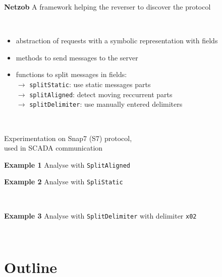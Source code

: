 \documentclass{beamer}
\newcounter{m} %
\newcounter{c} %
\begin{document}
\begin{frame}{\bf \textbf{Netzob}}
  A framework helping the reverser to discover the protocol
 
  ~

  \begin{itemize}
    \item abstraction of requests with a symbolic representation with fields
    \item methods to send messages to the server
    \item functions to split messages in fields:\\
    \quad\quad$\rightarrow$ \texttt{splitStatic}: use static messages parts\\
    \quad\quad$\rightarrow$ \texttt{splitAligned}: detect moving reccurrent parts\\
    \quad\quad$\rightarrow$ \texttt{splitDelimiter}: use manually entered delimiters
  \end{itemize}

  ~

  Experimentation on Snap7 (S7) protocol, \\used in SCADA communication

\end{frame}


\begin{frame}{\bf Example 1}
  Analyse with \texttt{SplitAligned}
  ~

  \tiny
\end{frame}

\begin{frame}{\bf Example 2}
  Analyse with \texttt{SpliStatic}

  ~

  \tiny
\end{frame}

\begin{frame}{\bf Example 3}
  Analyse with \texttt{SplitDelimiter} with delimiter \texttt{x02}

  ~

  \tiny
\end{frame}

\section{Outline}
\end{document}
